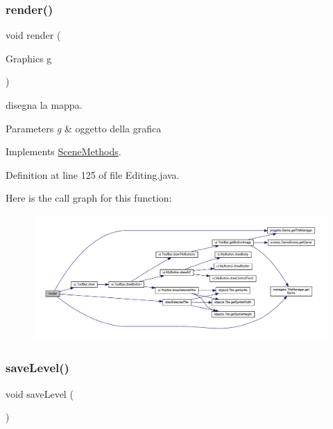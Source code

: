 \subsubsection{\texorpdfstring{render()}{render()}}
{\footnotesize\ttfamily void render (\begin{DoxyParamCaption}\item[{Graphics}]{g }\end{DoxyParamCaption})}



disegna la mappa. 


\begin{DoxyParams}{Parameters}
{\em g} & oggetto della grafica \\
\hline
\end{DoxyParams}


Implements \hyperlink{interfacescenes_1_1_scene_methods_a203b6ad9d5e4d54dd1152986eec4dedc}{Scene\+Methods}.



Definition at line 125 of file Editing.\+java.

Here is the call graph for this function\+:
\nopagebreak
\begin{figure}[H]
\begin{center}
\leavevmode
\includegraphics[width=350pt]{classscenes_1_1_editing_a203b6ad9d5e4d54dd1152986eec4dedc_cgraph}
\end{center}
\end{figure}
\mbox{\label{classscenes_1_1_editing_af1c1bf274cd89c18726a992a073a7c6d}} 
\subsubsection{\texorpdfstring{save\+Level()}{saveLevel()}}
{\footnotesize\ttfamily void save\+Level (\begin{DoxyParamCaption}{ }\end{DoxyParamCaption})}



